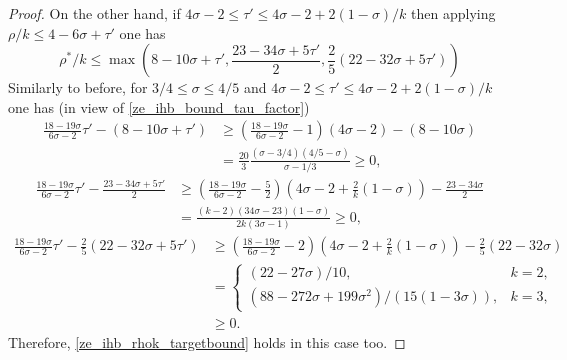 \begin{proof}
On the other hand, if $4\sigma - 2 \le \tau' \le 4\sigma - 2 + 2(1 - \sigma)/k$ then applying $\rho/k \le 4 - 6\sigma + \tau'$ one has 
\[ 
\rho^*/k \le \max(8 -10\sigma + \tau',\frac{23 - 34\sigma + 5\tau'}{2}, \frac{2}{5}(22 - 32\sigma +  5\tau'))
\]
Similarly to before, for $3/4 \le \sigma \le 4/5$ and $4\sigma - 2 \le \tau' \le 4\sigma - 2 + 2(1 - \sigma)/k$ one has (in view of \eqref{ze_ihb_bound_tau_factor})
\begin{align*}
\frac{18 - 19\sigma}{6\sigma - 2}\tau' - (8 - 10\sigma + \tau') &\ge \left(\frac{18 - 19\sigma}{6\sigma - 2} - 1\right)(4\sigma - 2) - (8 - 10\sigma) \\
&= \frac{20}{3}\frac{(\sigma - 3/4) (4/5 - \sigma)}{\sigma - 1/3} \ge 0,
\end{align*}
\begin{align*}
\frac{18 - 19\sigma}{6\sigma - 2}\tau' - \frac{23 - 34\sigma + 5\tau'}{2} &\ge \left(\frac{18 - 19\sigma}{6\sigma - 2} - \frac{5}{2}\right)(4\sigma - 2 + \frac{2}{k}(1 - \sigma)) - \frac{23 - 34\sigma}{2}\\
&= \frac{(k - 2)(34\sigma - 23)(1 - \sigma)}{2k(3\sigma - 1)} \ge 0,
\end{align*}
\begin{align*}
\frac{18 - 19\sigma}{6\sigma - 2}\tau' - \frac{2}{5}(22 - 32\sigma +  5\tau') &\ge \left(\frac{18 - 19\sigma}{6\sigma - 2} - 2\right)(4\sigma - 2 + \frac{2}{k}(1 - \sigma)) - \frac{2}{5}(22 - 32\sigma)\\
&= \begin{cases}
(22 - 27\sigma)/10,&k = 2,\\
(88 - 272\sigma + 199\sigma^2)/(15(1 - 3\sigma)),&k=3,
\end{cases}\\
&\ge 0. 
\end{align*}
Therefore, \eqref{ze_ihb_rhok_targetbound} holds in this case too.


\end{proof}

